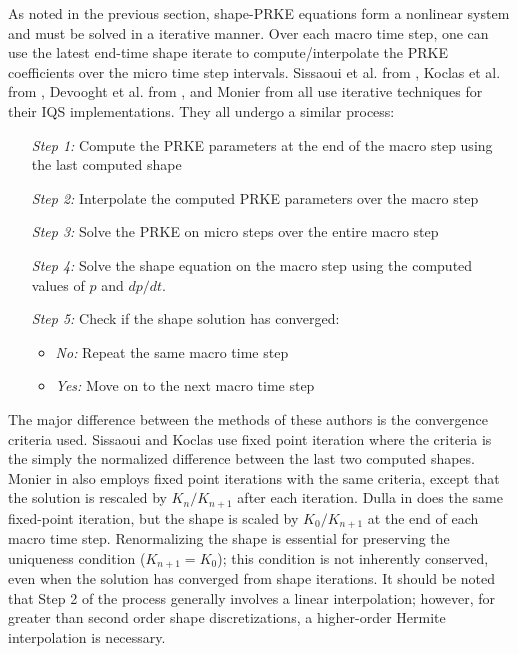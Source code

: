 \documentclass{elsarticle}
\begin{document}
As noted in the previous section, shape-PRKE equations form a nonlinear system and must be solved in a iterative manner.  Over each macro time step,  one can 
use the latest end-time shape iterate to compute/interpolate the PRKE coefficients over the micro time step intervals. 
Sissaoui et al. from \cite{Sissaoui_1995}, Koclas et al. from \cite{Koclas_1996}, Devooght et al. from \cite{Devooght_1984}, and Monier from \cite{Monier_diss} all use 
iterative techniques for their IQS implementations.  They all undergo a similar process:
\begin{adjustwidth*}{0cm}{4mm}
\begin{itemize}
\item[\textit{Step 1:}] Compute the PRKE parameters at the end of the macro step using the last computed shape
\item[\textit{Step 2:}] Interpolate the computed PRKE parameters over the macro step
\item[\textit{Step 3:}] Solve the PRKE on micro steps over the entire macro step
\item[\textit{Step 4:}] Solve the shape equation on the macro step using the computed values of $p$ and $dp/dt$.
\item[\textit{Step 5:}] Check if the shape solution has converged:
	\begin{itemize}
	\item \textit{No:} Repeat the same macro time step
	\item \textit{Yes:} Move on to the next macro time step
	\end{itemize}
\end{itemize}
\end{adjustwidth*}

The major difference between the methods of these authors is the convergence criteria used.  Sissaoui and Koclas \cite{Sissaoui_1995, Koclas_1996} 
use fixed point iteration where the criteria is the simply the normalized difference between the last two computed shapes.  Monier in \cite{Monier_diss} 
also employs fixed point iterations with the same criteria, except that the solution is rescaled by $K_n/K_{n+1}$ after each iteration. Dulla in 
\cite{Dulla2008} does the same fixed-point iteration, but the shape is scaled by $K_0/K_{n+1}$ at the end of each macro time step. Renormalizing 
the shape is essential for preserving the uniqueness condition ($K_{n+1} = K_0$); this condition is not inherently conserved, even when the 
solution has converged from shape iterations.
It should be noted that Step 2 of the process generally involves a linear interpolation; however, for greater than second order shape discretizations, a higher-order Hermite interpolation is necessary. 
\end{document}

